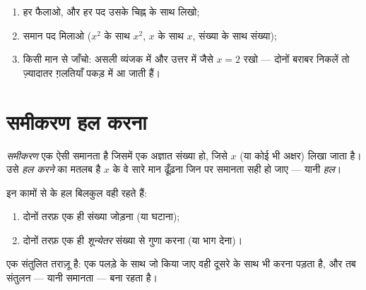 \begin{method}[फैलाओ और सरल करो]\label{met:g8:equations:reduce}
\begin{enumerate}
  \item हर  फैलाओ, और हर पद उसके चिह्न के साथ लिखो;
  \item समान पद मिलाओ ($x^2$ के साथ $x^2$, $x$ के साथ $x$, संख्या
        के साथ संख्या);
  \item किसी मान से जाँचो: असली व्यंजक में और उत्तर में जैसे
        $x = 2$ रखो --- दोनों बराबर निकलें तो ज़्यादातर ग़लतियाँ
        पकड़ में आ जाती हैं।
\end{enumerate}
\end{method}

\section{समीकरण हल करना}

\begin{definition}[समीकरण]\label{def:g8:equations:def}
\emph{समीकरण} एक ऐसी समानता है जिसमें एक अज्ञात
संख्या हो, जिसे $x$ (या कोई भी अक्षर) लिखा जाता है। उसे \emph{हल
करने} का मतलब है $x$ के वे सारे मान ढूँढ़ना जिन पर समानता सही हो
जाए --- यानी \emph{हल}।
\end{definition}

\begin{theorem}[तुला के नियम]\label{thm:g8:equations:balance}
इन कामों से  के हल बिलकुल वही रहते हैं:
\begin{enumerate}
  \item दोनों तरफ़ एक ही संख्या जोड़ना (या घटाना);
  \item दोनों तरफ़ एक ही \emph{शून्येतर} संख्या से गुणा करना (या
        भाग देना)।
\end{enumerate}
\end{theorem}
\admitted

\begin{omfigure}

{\small {} एक संतुलित तराज़ू है: एक पलड़े के साथ जो किया जाए वही
दूसरे के साथ भी करना पड़ता है, और तब संतुलन --- यानी समानता --- बना
रहता है।}
\end{omfigure}

